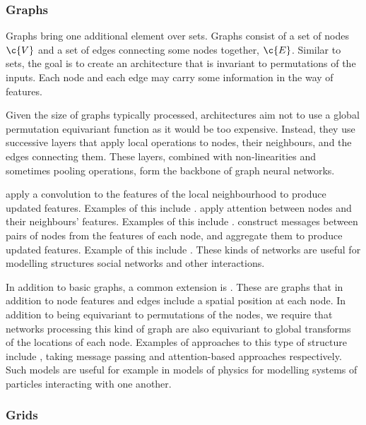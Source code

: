 \subsubsection{Graphs}

Graphs bring one additional element over sets.
Graphs consist of a set of nodes \(\c{V}\) and a set of edges connecting some nodes together, \(\c{E}\).
Similar to sets, the goal is to create an architecture that is invariant to permutations of the inputs.
Each node and each edge may carry some information in the way of features.

Given the size of graphs typically processed, architectures aim not to use a global permutation equivariant function as it would be too expensive.
Instead, they use successive layers that apply local operations to nodes, their neighbours, and the edges connecting them.
These layers, combined with non-linearities and sometimes pooling operations, form the backbone of graph neural networks.

 apply a convolution to the features of the local neighbourhood to produce updated features.
Examples of this include \textcite{kipf2016semi, defferrard2016convolutional, wu2019simplifying}.  apply attention between nodes and their neighbours' features. Examples of this include \textcite{velickovic2017graph,monti2017geometric,zhang2018gaan}.  construct messages between pairs of nodes from the features of each node, and aggregate them to produce updated features. Example of this include \textcite{gilmer2017neural, battaglia2018relational}.
These kinds of networks are useful for modelling structures social networks and other interactions.

In addition to basic graphs, a common extension is .
These are graphs that in addition to node features and edges include a spatial position at each node.
In addition to being equivariant to permutations of the nodes, we require that networks processing this kind of graph are also equivariant to global transforms of the locations of each node.
Examples of approaches to this type of structure include \textcite{satorras2021en,fuchs2020se}, taking message passing and attention-based approaches respectively.
Such models are useful for example in models of physics for modelling systems of particles interacting with one another.

\subsubsection{Grids}

